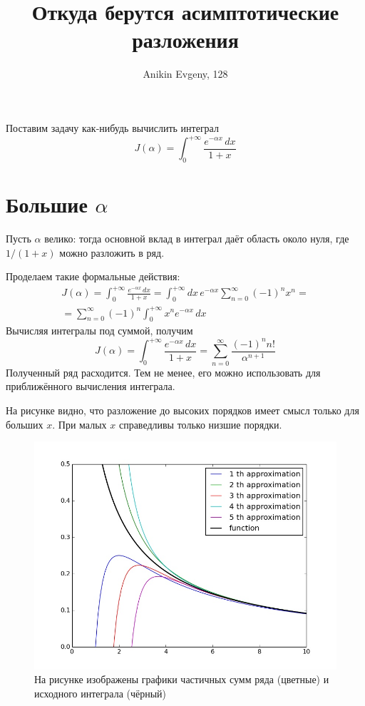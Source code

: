 \documentclass{article}
\title{Откуда берутся асимптотические разложения}
\author{Anikin Evgeny, 128}
\begin{document}
\maketitle
Поставим задачу как-нибудь вычислить интеграл 
$$
	J(\alpha) = \int_{0}^{+\infty} \frac{e^{-\alpha x}\,dx}{1 + x} 
$$

\section{Большие $\alpha$}
Пусть $\alpha$ велико: тогда основной вклад в интеграл даёт область около нуля, где
$1/(1+x)$ можно разложить в ряд.

Проделаем такие формальные действия:
\begin{multline}
	J(\alpha) = \int_{0}^{+\infty} \frac{e^{-\alpha x}\,dx}{1 + x} = 
		\int_{0}^{+\infty} dx\,e^{-\alpha x}\sum_{n=0}^{\infty} (-1)^n x^n = \\
		=\sum_{n=0}^{\infty}(-1)^n \int_{0}^{+\infty} x^n e^{-\alpha x} \,dx
\end{multline} 
Вычисляя интегралы под суммой, получим
$$
	J(\alpha)=\int_{0}^{+\infty} \frac{e^{-\alpha x}\,dx}{1 + x}  = 
		\sum_{n=0}^{\infty}\frac{(-1)^n n!}{\alpha^{n+1}}
$$
Полученный ряд расходится. Тем не менее, его можно использовать для приближённого 
вычисления интеграла.

На рисунке видно, что разложение до высоких порядков имеет смысл только для больших $x$.
При малых $x$ справедливы только низшие порядки.

\begin{figure}[h]
	\centering
	\includegraphics[width=0.9\linewidth]{expansion.jpeg}
	\caption{
		На рисунке изображены графики частичных сумм ряда (цветные) и исходного интеграла
		(чёрный)
		}
\end{figure}
\end{document}

